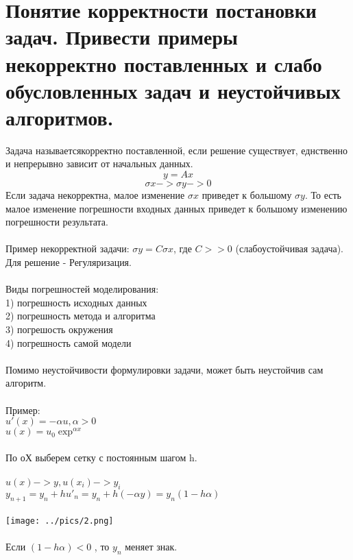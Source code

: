 \documentclass[12pt,a4paper]{article}
\begin{document}
	\section{Понятие корректности постановки задач. Привести примеры некорректно поставленных и слабо обусловленных задач и  неустойчивых алгоритмов. }
	Задача называетсякорректно поставленной, если решение существует, еднственно и непрерывно зависит от начальных данных. 
	\begin{equation}
	 y = Ax 
	 \end{equation}
	\begin{equation}
 		\sigma x -> \sigma y -> 0
	\end{equation}
	Если задача некорректна, малое изменение $\sigma x$ приведет к большому $\sigma y$. То есть малое изменение погрешности входных данных приведет к большому изменению погрешности результата.\\\\	
	Пример некорректной задачи:
	$\sigma y = C \sigma x $, где $C >> 0$ (слабоустойчивая задача).\\
	Для решение - Регуляризация.\\\\	
	Виды погрешностей моделирования:\\
	1) погрешность исходных данных\\
	2) погрешность метода и алгоритма\\
	3) погрешость окружения\\
	4) погрешность самой модели\\\\	
	Помимо неустойчивости формулировки задачи, может быть неустойчив сам алгоритм.\\\\
	Пример:\\
	$u'(x) = - \alpha u, \alpha > 0 $\\
	$u (x) = u_0\exp^{\alpha x}$\\\\
	По оХ выберем сетку с постоянным шагом h. \\\\
	$u (x) -> y,  u (x_i) -> y_i$\\
	$y_{n+1} = y_n + hu'_n = y_n + h(-\alpha y) = y_n (1 - h\alpha) $\\\\
	\texttt{[image: ../pics/2.png]}\\
	\\Если  $(1 - h\alpha) < 0 $ ,  то $y_n$ меняет знак.\\
\end{document}
